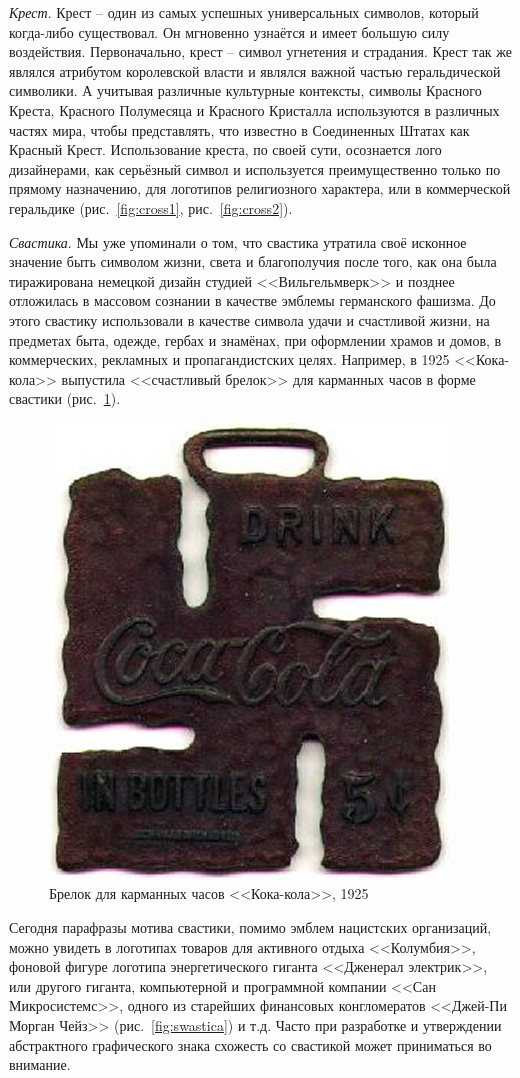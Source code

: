 \emph{Крест}. Крест -- один из самых успешных универсальных символов, который
  когда-либо существовал. Он мгновенно узнаётся и  имеет большую силу
  воздействия. Первоначально, крест -- символ угнетения и страдания. Крест так
  же являлся атрибутом королевской власти и являлся важной частью
  геральдической символики. А учитывая различные культурные контексты,
  символы Красного Креста, Красного Полумесяца и Красного Кристалла
  используются в различных частях мира, чтобы представлять, что известно в
  Соединенных Штатах как Красный Крест. Использование креста, по своей сути,
  осознается лого дизайнерами, как серьёзный символ и используется
  преимущественно только по прямому назначению, для логотипов религиозного
  характера, или в коммерческой геральдике (рис.~\ref{fig:cross1}, рис.~\ref{fig:cross2}).


\emph{Свастика}. Мы уже упоминали о том, что свастика утратила своё исконное
  значение быть символом жизни, света и благополучия после того, как она была
  тиражирована немецкой дизайн студией <<Вильгельмверк>> и позднее отложилась в
  массовом сознании в качестве эмблемы германского фашизма. До этого свастику
  использовали в качестве символа удачи и счастливой жизни, на предметах быта,
  одежде, гербах и знамёнах, при оформлении храмов и домов, в коммерческих,
  рекламных и пропагандистских целях. Например, в 1925 <<Кока-кола>> выпустила
  <<счастливый брелок>> для карманных часов в форме свастики (рис.~\ref{fig:cocaswastica}).

  \begin{figure}[h!]
  \centering
  \includegraphics[width=.2\linewidth]{images/cocaswastica}
  \caption{Брелок для карманных часов <<Кока-кола>>, 1925}
  \label{fig:cocaswastica}
\end{figure}

  Сегодня парафразы мотива свастики, помимо эмблем нацистских организаций,
  можно увидеть в логотипах товаров для активного отдыха <<Колумбия>>,
  фоновой фигуре логотипа энергетического гиганта <<Дженерал электрик>>,
  или другого гиганта, компьютерной и программной компании <<Сан Микросистемс>>,
  одного из старейших финансовых конгломератов <<Джей-Пи Морган Чейз>> (рис.~\ref{fig:swastica})
  и т.д. Часто при разработке и утверждении абстрактного графического знака
  схожесть со свастикой может приниматься во внимание.

